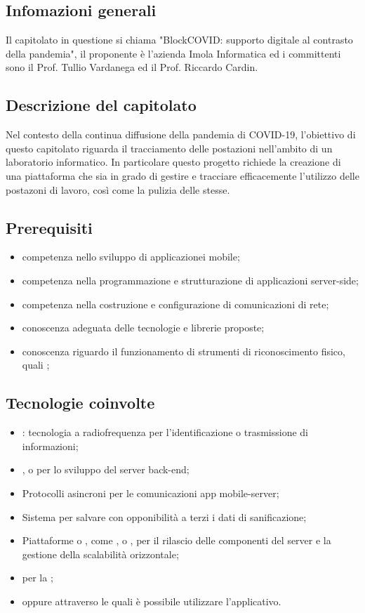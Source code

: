 
\subsection{Infomazioni generali}
Il capitolato in questione si chiama "BlockCOVID: supporto digitale al contrasto della pandemia", il proponente è l'azienda Imola Informatica ed i committenti sono il Prof. Tullio Vardanega ed il Prof. Riccardo Cardin.

\subsection{Descrizione del capitolato}
Nel contesto della continua diffusione della pandemia di COVID-19, l'obiettivo di questo capitolato riguarda il tracciamento delle postazioni nell'ambito di un laboratorio informatico. In particolare questo progetto richiede la creazione di una piattaforma che sia in grado di gestire e tracciare efficacemente l'utilizzo delle postazoni di lavoro, così come la pulizia delle stesse.

\subsection{Prerequisiti}
\begin{itemize}
\item competenza nello sviluppo di applicazionei mobile;
\item competenza nella programmazione e strutturazione di applicazioni server-side;
\item competenza nella costruzione e configurazione di comunicazioni di rete;
\item conoscenza adeguata delle tecnologie e librerie proposte;
\item conoscenza riguardo il funzionamento di strumenti di riconoscimento fisico, quali ;
\end{itemize}

\subsection{Tecnologie coinvolte}
\begin{itemize}
\item {}: tecnologia a radiofrequenza per l'identificazione o trasmissione di informazioni;
\item {},  o  per lo sviluppo del server back-end;
\item Protocolli asincroni per le comunicazioni app mobile-server;
\item Sistema  per salvare con opponibilità a terzi i dati di sanificazione;
\item Piattaforme  o , come ,  o , per il rilascio delle componenti del server e la gestione della scalabilità orizzontale;
\item {} per la ;
\item {} oppure  attraverso le quali è possibile utilizzare l'applicativo.
\end{itemize}

